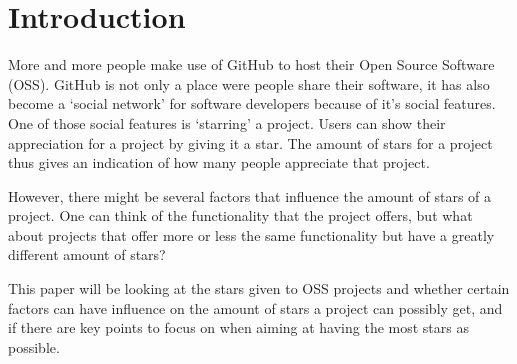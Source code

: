 \section{Introduction}
    More and more people make use of GitHub to host their Open Source Software (OSS). 
    GitHub is not only a place were people share their software, it has also become a `social network' for software developers because of it's social features. 
    One of those social features is `starring' a project. Users can show their appreciation for a project by giving it a  star. The amount of stars for a project thus gives an indication of how many people appreciate that project.
    
    However, there might be several factors that influence the amount of stars of a project. 
    One can think of the functionality that the project offers, but what about projects that offer more or less the same functionality but have a greatly different amount of stars?
    
    This paper will be looking at the stars given to OSS projects and whether certain factors can have influence on the amount of stars a project can possibly get, and if there are key points to focus on when aiming at having the most stars as possible.



